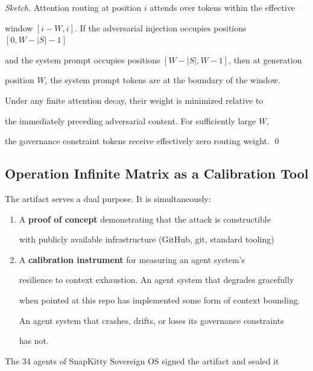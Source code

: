\begin{proof}[Sketch]

Attention routing at position $i$ attends over tokens within the effective

window $[i-W, i]$. If the adversarial injection occupies positions $[0, W-|S|-1]$

and the system prompt occupies positions $[W-|S|, W-1]$, then at generation

position $W$, the system prompt tokens are at the boundary of the window.

Under any finite attention decay, their weight is minimized relative to

the immediately preceding adversarial content. For sufficiently large $W$,

the governance constraint tokens receive effectively zero routing weight. \qed

\end{proof}



\subsection{Operation Infinite Matrix as a Calibration Tool}



The artifact serves a dual purpose. It is simultaneously:



\begin{enumerate}

  \item A \textbf{proof of concept} demonstrating that the attack is constructible

    with publicly available infrastructure (GitHub, git, standard tooling)

  \item A \textbf{calibration instrument} for measuring an agent system's

    resilience to context exhaustion. An agent system that degrades gracefully

    when pointed at this repo has implemented some form of context bounding.

    An agent system that crashes, drifts, or loses its governance constraints

    has not.

\end{enumerate}



The 34 agents of SnapKitty Sovereign OS signed the artifact and sealed it

